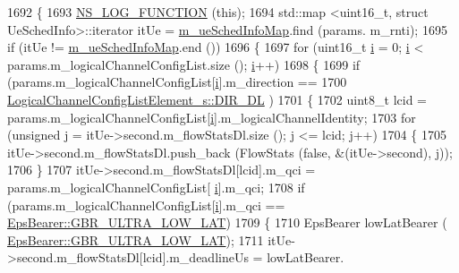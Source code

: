 \begin{DoxyCode}
1692 \{
1693         \hyperlink{log-macros-disabled_8h_a90b90d5bad1f39cb1b64923ea94c0761}{NS\_LOG\_FUNCTION} (\textcolor{keyword}{this});
1694   std::map <uint16\_t, struct UeSchedInfo>::iterator itUe = \hyperlink{classns3_1_1MmWaveFlexTtiMaxWeightMacScheduler_a6c90cb4d10b9d6347f7447508f5bebfe}{m\_ueSchedInfoMap}.find (params.
      m\_rnti);
1695   \textcolor{keywordflow}{if} (itUe != \hyperlink{classns3_1_1MmWaveFlexTtiMaxWeightMacScheduler_a6c90cb4d10b9d6347f7447508f5bebfe}{m\_ueSchedInfoMap}.end ())
1696   \{
1697         \textcolor{keywordflow}{for} (uint16\_t \hyperlink{bernuolliDistribution_8m_a6f6ccfcf58b31cb6412107d9d5281426}{i} = 0; \hyperlink{bernuolliDistribution_8m_a6f6ccfcf58b31cb6412107d9d5281426}{i} < params.m\_logicalChannelConfigList.size (); \hyperlink{bernuolliDistribution_8m_a6f6ccfcf58b31cb6412107d9d5281426}{i}++)
1698         \{
1699                 \textcolor{keywordflow}{if} (params.m\_logicalChannelConfigList[\hyperlink{bernuolliDistribution_8m_a6f6ccfcf58b31cb6412107d9d5281426}{i}].m\_direction ==
1700                                 \hyperlink{structns3_1_1LogicalChannelConfigListElement__s_a0ce1e3a6af4d9a3e9fc19361d0af4e00a31e389072f64c3e83e1da04be05ada0f}{LogicalChannelConfigListElement\_s::DIR\_DL}
      )
1701                 \{
1702                 uint8\_t lcid = params.m\_logicalChannelConfigList[\hyperlink{bernuolliDistribution_8m_a6f6ccfcf58b31cb6412107d9d5281426}{i}].m\_logicalChannelIdentity;
1703                 \textcolor{keywordflow}{for} (\textcolor{keywordtype}{unsigned} j = itUe->second.m\_flowStatsDl.size (); j <= lcid; j++)
1704                 \{
1705                         itUe->second.m\_flowStatsDl.push\_back (FlowStats (\textcolor{keyword}{false}, &(itUe->second), j));
1706                 \}
1707                         itUe->second.m\_flowStatsDl[lcid].m\_qci = params.m\_logicalChannelConfigList[
      \hyperlink{bernuolliDistribution_8m_a6f6ccfcf58b31cb6412107d9d5281426}{i}].m\_qci;
1708                         \textcolor{keywordflow}{if} (params.m\_logicalChannelConfigList[\hyperlink{bernuolliDistribution_8m_a6f6ccfcf58b31cb6412107d9d5281426}{i}].m\_qci == 
      \hyperlink{structns3_1_1EpsBearer_aecf0c67109c5eb4ec0b07226fff5885ea1b3267491c7ea82ddc90b433c429c7c1}{EpsBearer::GBR\_ULTRA\_LOW\_LAT})
1709                         \{
1710                                 EpsBearer lowLatBearer (
      \hyperlink{structns3_1_1EpsBearer_aecf0c67109c5eb4ec0b07226fff5885ea1b3267491c7ea82ddc90b433c429c7c1}{EpsBearer::GBR\_ULTRA\_LOW\_LAT});
1711                                 itUe->second.m\_flowStatsDl[lcid].m\_deadlineUs = lowLatBearer.

\end{DoxyCode}
